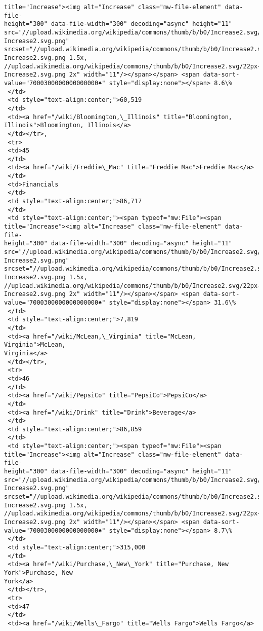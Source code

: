 \documentclass[11pt]{article}
\begin{document}
\begin{tcolorbox}[breakable, size=fbox, boxrule=.5pt, pad at break*=1mm, opacityfill=0]
\begin{Verbatim}[commandchars=\\\{\}]
title="Increase"><img alt="Increase" class="mw-file-element" data-file-
height="300" data-file-width="300" decoding="async" height="11"
src="//upload.wikimedia.org/wikipedia/commons/thumb/b/b0/Increase2.svg/11px-
Increase2.svg.png"
srcset="//upload.wikimedia.org/wikipedia/commons/thumb/b/b0/Increase2.svg/17px-
Increase2.svg.png 1.5x,
//upload.wikimedia.org/wikipedia/commons/thumb/b/b0/Increase2.svg/22px-
Increase2.svg.png 2x" width="11"/></span></span> <span data-sort-
value="7000300000000000000♠" style="display:none"></span> 8.6\%
 </td>
 <td style="text-align:center;">60,519
 </td>
 <td><a href="/wiki/Bloomington,\_Illinois" title="Bloomington,
Illinois">Bloomington, Illinois</a>
 </td></tr>,
 <tr>
 <td>45
 </td>
 <td><a href="/wiki/Freddie\_Mac" title="Freddie Mac">Freddie Mac</a>
 </td>
 <td>Financials
 </td>
 <td style="text-align:center;">86,717
 </td>
 <td style="text-align:center;"><span typeof="mw:File"><span
title="Increase"><img alt="Increase" class="mw-file-element" data-file-
height="300" data-file-width="300" decoding="async" height="11"
src="//upload.wikimedia.org/wikipedia/commons/thumb/b/b0/Increase2.svg/11px-
Increase2.svg.png"
srcset="//upload.wikimedia.org/wikipedia/commons/thumb/b/b0/Increase2.svg/17px-
Increase2.svg.png 1.5x,
//upload.wikimedia.org/wikipedia/commons/thumb/b/b0/Increase2.svg/22px-
Increase2.svg.png 2x" width="11"/></span></span> <span data-sort-
value="7000300000000000000♠" style="display:none"></span> 31.6\%
 </td>
 <td style="text-align:center;">7,819
 </td>
 <td><a href="/wiki/McLean,\_Virginia" title="McLean, Virginia">McLean,
Virginia</a>
 </td></tr>,
 <tr>
 <td>46
 </td>
 <td><a href="/wiki/PepsiCo" title="PepsiCo">PepsiCo</a>
 </td>
 <td><a href="/wiki/Drink" title="Drink">Beverage</a>
 </td>
 <td style="text-align:center;">86,859
 </td>
 <td style="text-align:center;"><span typeof="mw:File"><span
title="Increase"><img alt="Increase" class="mw-file-element" data-file-
height="300" data-file-width="300" decoding="async" height="11"
src="//upload.wikimedia.org/wikipedia/commons/thumb/b/b0/Increase2.svg/11px-
Increase2.svg.png"
srcset="//upload.wikimedia.org/wikipedia/commons/thumb/b/b0/Increase2.svg/17px-
Increase2.svg.png 1.5x,
//upload.wikimedia.org/wikipedia/commons/thumb/b/b0/Increase2.svg/22px-
Increase2.svg.png 2x" width="11"/></span></span> <span data-sort-
value="7000300000000000000♠" style="display:none"></span> 8.7\%
 </td>
 <td style="text-align:center;">315,000
 </td>
 <td><a href="/wiki/Purchase,\_New\_York" title="Purchase, New York">Purchase, New
York</a>
 </td></tr>,
 <tr>
 <td>47
 </td>
 <td><a href="/wiki/Wells\_Fargo" title="Wells Fargo">Wells Fargo</a>

\end{Verbatim}
\end{tcolorbox}
\end{document}
